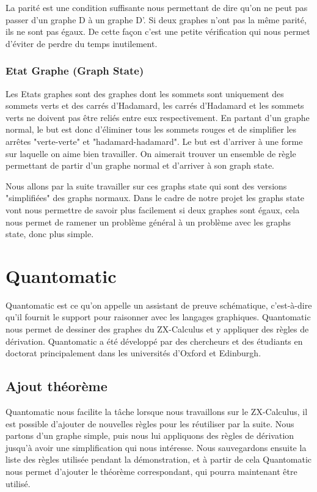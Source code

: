 \documentclass[a4paper,oneside]{book}
\begin{document}
La parité est une condition suffisante nous permettant de dire qu'on ne peut pas passer d'un graphe D à un graphe D’. Si deux graphes n'ont pas la même parité, ils ne sont pas égaux. De cette façon c'est une petite vérification qui nous permet d'éviter de perdre du temps inutilement.

\subsection{Etat Graphe (Graph State)}
Les Etats graphes sont des graphes dont les sommets sont uniquement des sommets verts et des carrés d'Hadamard, les carrés d'Hadamard et les sommets verts ne doivent pas être reliés entre eux respectivement. En partant d'un graphe normal, le but est donc d'éliminer tous les sommets rouges et de simplifier les arrêtes "verte-verte" et "hadamard-hadamard". Le but est d'arriver à une forme sur laquelle on aime bien travailler. On aimerait trouver un ensemble de règle permettant de partir d'un graphe normal et d'arriver à son graph state.

Nous allons par la suite travailler sur ces graphs state qui sont des versions "simplifiées" des graphs normaux. Dans le cadre de notre projet les graphs state vont nous permettre de savoir plus facilement si deux graphes sont égaux, cela nous permet de ramener un problème général à un problème avec les graphs state, donc plus simple.

\chapter{Quantomatic}
\minitoc
Quantomatic est ce qu'on appelle un assistant de preuve schématique, c'est-à-dire qu'il fournit le support pour raisonner avec les langages graphiques. Quantomatic nous permet de dessiner des graphes du ZX-Calculus et y appliquer des règles de dérivation. Quantomatic a été développé par des chercheurs et des étudiants en doctorat principalement dans les universités d'Oxford et Edinburgh.

\section{Ajout théorème}
Quantomatic nous facilite la tâche lorsque nous travaillons sur le ZX-Calculus, il est possible d'ajouter de nouvelles règles pour les réutiliser par la suite. Nous partons d'un graphe simple, puis nous lui appliquons des règles de dérivation jusqu'à avoir une simplification qui nous intéresse. Nous sauvegardons ensuite la liste des règles utilisée pendant la démonstration, et à partir de cela Quantomatic nous permet d'ajouter le théorème correspondant, qui pourra maintenant être utilisé.
\end{document}
